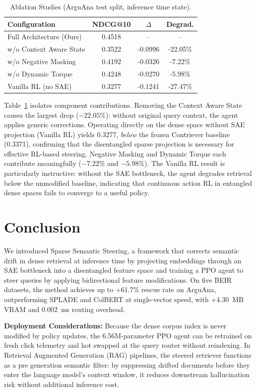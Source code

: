 \documentclass[sigconf]{acmart}
\begin{document}
\begin{table}[t]
  \caption{Ablation Studies (ArguAna test split, inference time state).}
  \label{tab:ablation}
  \begin{tabular}{lccc}
    \toprule
    Configuration & NDCG@10 & $\Delta$ & Degrad.\\
    \midrule
    Full Architecture (Ours) & 0.4518 & -- & --\\
    w/o Context Aware State & 0.3522 & -0.0996 & -22.05\%\\
    w/o Negative Masking & 0.4192 & -0.0326 & -7.22\%\\
    w/o Dynamic Torque & 0.4248 & -0.0270 & -5.98\%\\
    Vanilla RL (no SAE) & 0.3277 & -0.1241 & -27.47\%\\
    \bottomrule
  \end{tabular}
\end{table}

Table~\ref{tab:ablation} isolates component contributions. Removing the Context Aware State causes the largest drop ($-22.05\%$): without original query context, the agent applies generic corrections. Operating directly on the dense space without SAE projection (Vanilla RL) yields 0.3277, \textit{below} the frozen Contriever baseline (0.3371), confirming that the disentangled sparse projection is necessary for effective RL-based steering. Negative Masking and Dynamic Torque each contribute meaningfully ($-7.22\%$ and $-5.98\%$). The Vanilla RL result is particularly instructive: without the SAE bottleneck, the agent degrades retrieval below the unmodified baseline, indicating that continuous action RL in entangled dense spaces fails to converge to a useful policy.

\section{Conclusion}

We introduced Sparse Semantic Steering, a framework that corrects semantic drift in dense retrieval at inference time by projecting embeddings through an SAE bottleneck into a disentangled feature space and training a PPO agent to steer queries by applying bidirectional feature modifications. On five BEIR datasets, the method achieves up to +61.7\% rescue rate on ArguAna, outperforming SPLADE and ColBERT at single-vector speed, with +4.30~MB VRAM and 0.002~ms routing overhead.

\textbf{Deployment Considerations:} Because the dense corpus index is never modified by policy updates, the 6.56M-parameter PPO agent can be retrained on fresh click telemetry and hot swapped at the query router without reindexing. In Retrieval Augmented Generation (RAG) pipelines, the steered retriever functions as a pre generation semantic filter: by suppressing drifted documents before they enter the language model's context window, it reduces downstream hallucination risk without additional inference cost.
\end{document}
